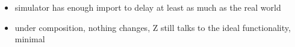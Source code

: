 \begin{itemize}
\item simulator has enough import to delay at least as much as the real world
\item under composition, nothing changes, Z still talks to the ideal functionality, minimal
\end{itemize}

%
%
%
%
%
%
%

